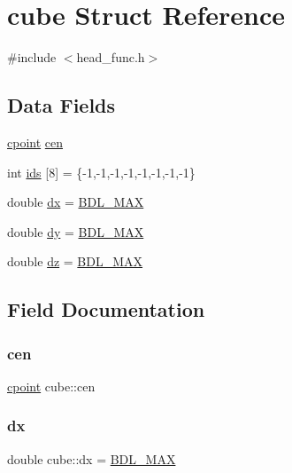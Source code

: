 \hypertarget{structcube}{}\section{cube Struct Reference}
\label{structcube}


{\ttfamily \#include $<$head\+\_\+func.\+h$>$}

\subsection*{Data Fields}
\begin{DoxyCompactItemize}
\item 
\mbox{\hyperlink{structcpoint}{cpoint}} \mbox{\hyperlink{structcube_a07d907ab1c3c9290c805d8632a86abfe}{cen}}
\item 
int \mbox{\hyperlink{structcube_ab7fb6cd932d5fcc229aef51535913172}{ids}} \mbox{[}8\mbox{]} = \{-\/1,-\/1,-\/1,-\/1,-\/1,-\/1,-\/1,-\/1\}
\item 
double \mbox{\hyperlink{structcube_a93a52f08c5463b142ed8fda2b9acd3a8}{dx}} = \mbox{\hyperlink{head__func_8h_a171f39ecf5d0b8067fd66e19e82f334d}{B\+D\+L\+\_\+\+M\+AX}}
\item 
double \mbox{\hyperlink{structcube_a8afa605328f4d86b6b352c879bb72345}{dy}} = \mbox{\hyperlink{head__func_8h_a171f39ecf5d0b8067fd66e19e82f334d}{B\+D\+L\+\_\+\+M\+AX}}
\item 
double \mbox{\hyperlink{structcube_a30cf2dabf20ae0c9fda30970c6808a3d}{dz}} = \mbox{\hyperlink{head__func_8h_a171f39ecf5d0b8067fd66e19e82f334d}{B\+D\+L\+\_\+\+M\+AX}}
\end{DoxyCompactItemize}


\subsection{Field Documentation}
\mbox{\label{structcube_a07d907ab1c3c9290c805d8632a86abfe}} 
\subsubsection{\texorpdfstring{cen}{cen}}
{\footnotesize\ttfamily \mbox{\hyperlink{structcpoint}{cpoint}} cube\+::cen}

\mbox{\label{structcube_a93a52f08c5463b142ed8fda2b9acd3a8}} 
\subsubsection{\texorpdfstring{dx}{dx}}
{\footnotesize\ttfamily double cube\+::dx = \mbox{\hyperlink{head__func_8h_a171f39ecf5d0b8067fd66e19e82f334d}{B\+D\+L\+\_\+\+M\+AX}}}


